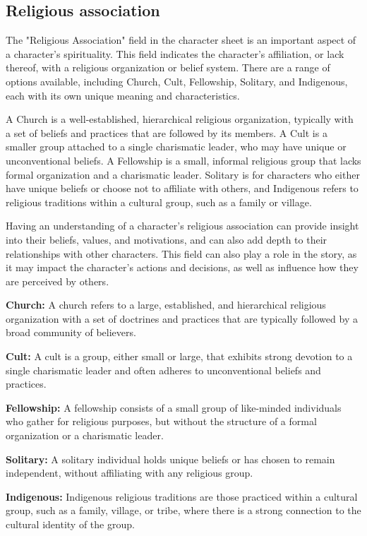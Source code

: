 \documentclass[12pt]{book}  %
\begin{document}
\subsection{\textbf{Religious association}}

The "Religious Association" field in the character sheet is an important aspect of a character's spirituality. This field indicates the character's affiliation, or lack thereof, with a religious organization or belief system. There are a range of options available, including Church, Cult, Fellowship, Solitary, and Indigenous, each with its own unique meaning and characteristics.

A Church is a well-established, hierarchical religious organization, typically with a set of beliefs and practices that are followed by its members. A Cult is a smaller group attached to a single charismatic leader, who may have unique or unconventional beliefs. A Fellowship is a small, informal religious group that lacks formal organization and a charismatic leader. Solitary is for characters who either have unique beliefs or choose not to affiliate with others, and Indigenous refers to religious traditions within a cultural group, such as a family or village.

Having an understanding of a character's religious association can provide insight into their beliefs, values, and motivations, and can also add depth to their relationships with other characters. This field can also play a role in the story, as it may impact the character's actions and decisions, as well as influence how they are perceived by others.

\textbf{Church:} A church refers to a large, established, and hierarchical religious organization with a set of doctrines and practices that are typically followed by a broad community of believers.

\textbf{Cult:} A cult is a group, either small or large, that exhibits strong devotion to a single charismatic leader and often adheres to unconventional beliefs and practices.

\textbf{Fellowship:} A fellowship consists of a small group of like-minded individuals who gather for religious purposes, but without the structure of a formal organization or a charismatic leader.

\textbf{Solitary:} A solitary individual holds unique beliefs or has chosen to remain independent, without affiliating with any religious group.

\textbf{Indigenous:} Indigenous religious traditions are those practiced within a cultural group, such as a family, village, or tribe, where there is a strong connection to the cultural identity of the group.
\end{document}
